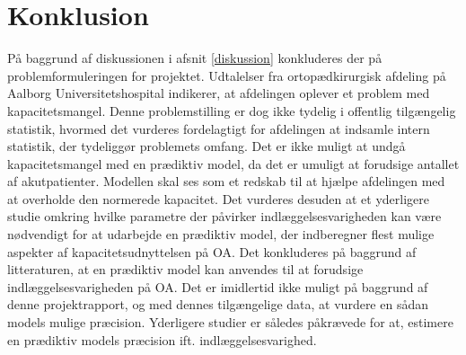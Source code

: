 \section{Konklusion}
På baggrund af diskussionen i afsnit \ref{diskussion} konkluderes der på problemformuleringen for projektet. Udtalelser fra ortopædkirurgisk afdeling på Aalborg Universitetshospital indikerer, at afdelingen oplever et problem med kapacitetsmangel. Denne problemstilling er dog ikke tydelig i offentlig tilgængelig statistik, hvormed det vurderes fordelagtigt for afdelingen at indsamle intern statistik, der tydeliggør problemets omfang. 
Det er ikke muligt at undgå kapacitetsmangel med en prædiktiv model, da det er umuligt at forudsige antallet af akutpatienter. Modellen skal ses som et redskab til at hjælpe afdelingen med at overholde den normerede kapacitet.
Det vurderes desuden at et yderligere studie omkring hvilke parametre der påvirker indlæggelsesvarigheden kan være nødvendigt for at udarbejde en prædiktiv model, der indberegner flest mulige aspekter af kapacitetsudnyttelsen på OA.
Det konkluderes på baggrund af litteraturen, at en prædiktiv model kan anvendes til at forudsige indlæggelsesvarigheden på OA. Det er imidlertid ikke muligt på baggrund af denne projektrapport, og med dennes tilgængelige data, at vurdere en sådan models mulige præcision. Yderligere studier er således påkrævede for at, estimere en prædiktiv models præcision ift. indlæggelsesvarighed.




